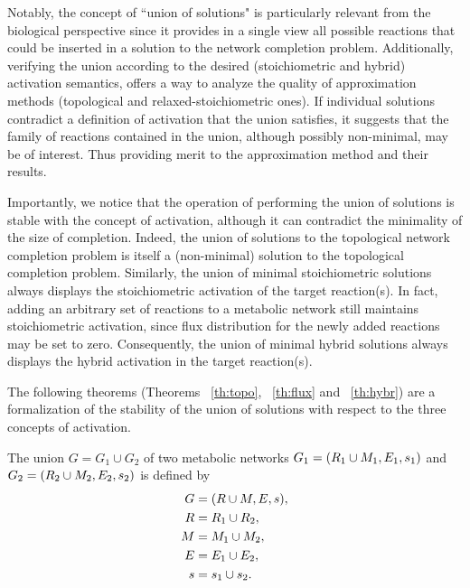 Notably, the concept of ``union of solutions" is particularly relevant from the biological perspective since it provides in a single view all possible reactions that could be inserted in a solution to the network completion problem.
%
Additionally, verifying the union according to the desired (stoichiometric and hybrid) activation semantics,
offers a way to analyze the quality of approximation methods (topological and relaxed-stoichiometric ones).
If individual solutions contradict a definition of activation that the union satisfies, it suggests that the family of reactions contained in the union, although possibly non-minimal, may be of interest.
Thus providing merit to the approximation method and their results.

Importantly, we notice that the operation of performing the union of solutions is stable with the concept of activation, although it can contradict the minimality of the size of completion.
Indeed, the union of solutions to the topological network completion problem is itself a (non-minimal) solution to the topological completion problem.
Similarly, the union of minimal stoichiometric solutions always displays the stoichiometric activation of the target reaction(s).
In fact, adding an arbitrary set of reactions to a metabolic network still maintains stoichiometric activation,
since flux distribution for the newly added reactions may be set to zero.
Consequently, the union of minimal hybrid solutions always displays the hybrid activation in the target reaction(s).
%

The following theorems (Theorems ~\ref{th:topo}, ~\ref{th:flux} and ~\ref{th:hybr}) are a formalization of the stability of the union of solutions with respect to the three concepts of activation.


The union $G=G_1\cup G_2$ of two metabolic networks $G_1=(R_1\cup M_1,E_1,s_1)$
and $G_2=(R_2\cup M_2,E_2,s_2)$ is defined by
\begin{align}
G &= (R\cup M, E, s), \label{eq:graph.union1}\\
R &= R_1\cup R_2, \label{eq:graph.union2}\\
M &= M_1\cup M_2, \label{eq:graph.union3}\\
E &= E_1\cup E_2, \label{eq:graph.union4}\\
s &= s_1\cup s_2. \label{eq:graph.union5}
\end{align}

